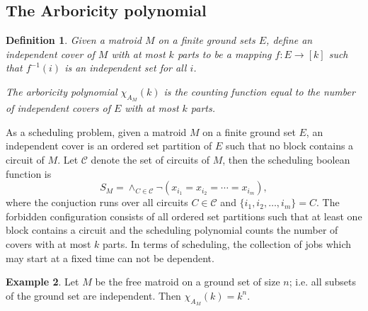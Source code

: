 \documentclass[12pt,reqno]{amsart}
\newtheorem{definition}{Definition}
\numberwithin{definition}{section}
\theoremstyle{definition}
\newtheorem{example}[definition]{Example}
\begin{document}
\subsection{The Arboricity polynomial}

\begin{definition} Given a matroid $M$ on a finite ground sets $E$, define an independent cover of $M$ with at most $k$ parts to be a mapping $f : E \rightarrow [k]$ such that $f^{-1}(i)$ is an independent set for all $i$.  

  The arboricity polynomial $\chi_{A_M}(k)$ is the counting function equal to the number of independent covers of $E$ with at most $k$ parts.
\end{definition}


As a scheduling problem, given a matroid $M$ on a finite ground set
$E$, an independent cover is an ordered set partition of $E$ such
that no block contains a circuit of $M$. Let $\mathcal{C}$ denote the set of circuits of $M$, then the scheduling boolean function is
$$S_M = \wedge_{C \in \mathcal{C}} \neg(x_{i_1} = x_{i_2} = \cdots = x_{i_m}),$$
where the conjuction runs over all circuits $C \in \mathcal{C}$ and $\{i_1, i_2, \ldots, i_m\} = C$.
The forbidden configuration consists of all ordered set partitions such that at least one block contains a circuit and the scheduling polynomial counts the number of covers with at most $k$ parts.   In terms of scheduling, the collection of jobs which may start at a fixed time can not be dependent.  

\begin{example}

Let $M$ be the free matroid on a ground set of size $n$; i.e. all subsets of the ground set are independent.  Then $\chi_{A_M}(k) = k^n$.  

\end{example}
\end{document}
